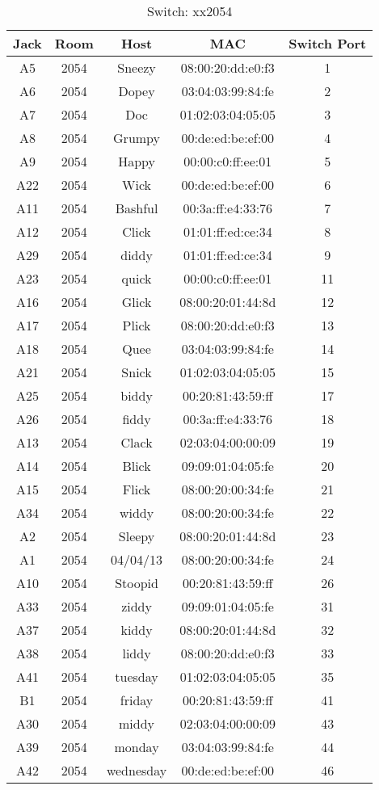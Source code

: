 \documentclass{article}
\begin{document}
\begin{table}[!htb]
	\centering
	\begin{tabular}{ | c | c | c | c | c | }
	\hline
	\textbf{Jack} & \textbf{Room} & \textbf{Host} & \textbf{MAC} & \textbf{Switch Port} \\ \hline
	A5 & 2054 & Sneezy & 08:00:20:dd:e0:f3 & 1 \\ \hline
	A6 & 2054 & Dopey & 03:04:03:99:84:fe & 2 \\ \hline
	A7 & 2054 & Doc & 01:02:03:04:05:05 & 3 \\ \hline
	A8 & 2054 & Grumpy & 00:de:ed:be:ef:00 & 4 \\ \hline
	A9 & 2054 & Happy & 00:00:c0:ff:ee:01 & 5 \\ \hline
	A22 & 2054 & Wick & 00:de:ed:be:ef:00 & 6 \\ \hline
	A11 & 2054 & Bashful & 00:3a:ff:e4:33:76 & 7 \\ \hline
	A12 & 2054 & Click & 01:01:ff:ed:ce:34 & 8 \\ \hline
	A29 & 2054 & diddy & 01:01:ff:ed:ce:34 & 9 \\ \hline
	A23 & 2054 & quick & 00:00:c0:ff:ee:01 & 11 \\ \hline
	A16 & 2054 & Glick & 08:00:20:01:44:8d & 12 \\ \hline
	A17 & 2054 & Plick & 08:00:20:dd:e0:f3 & 13 \\ \hline
	A18 & 2054 & Quee & 03:04:03:99:84:fe & 14 \\ \hline
	A21 & 2054 & Snick & 01:02:03:04:05:05 & 15 \\ \hline
	A25 & 2054 & biddy & 00:20:81:43:59:ff & 17 \\ \hline
	A26 & 2054 & fiddy & 00:3a:ff:e4:33:76 & 18 \\ \hline
	A13 & 2054 & Clack & 02:03:04:00:00:09 & 19 \\ \hline
	A14 & 2054 & Blick & 09:09:01:04:05:fe & 20 \\ \hline
	A15 & 2054 & Flick & 08:00:20:00:34:fe & 21 \\ \hline
	A34 & 2054 & widdy & 08:00:20:00:34:fe & 22 \\ \hline
	A2 & 2054 & Sleepy & 08:00:20:01:44:8d & 23 \\ \hline
	A1 & 2054 & 04/04/13 & 08:00:20:00:34:fe & 24 \\ \hline
	A10 & 2054 & Stoopid & 00:20:81:43:59:ff & 26 \\ \hline
	A33 & 2054 & ziddy & 09:09:01:04:05:fe & 31 \\ \hline
	A37 & 2054 & kiddy & 08:00:20:01:44:8d & 32 \\ \hline
	A38 & 2054 & liddy & 08:00:20:dd:e0:f3 & 33 \\ \hline
	A41 & 2054 & tuesday & 01:02:03:04:05:05 & 35 \\ \hline
	B1 & 2054 & friday & 00:20:81:43:59:ff & 41 \\ \hline
	A30 & 2054 & middy & 02:03:04:00:00:09 & 43 \\ \hline
	A39 & 2054 & monday & 03:04:03:99:84:fe & 44 \\ \hline
	A42 & 2054 & wednesday & 00:de:ed:be:ef:00 & 46 \\ \hline
	\end{tabular}
	\caption{Switch: xx2054}
\end{table}
\end{document}
